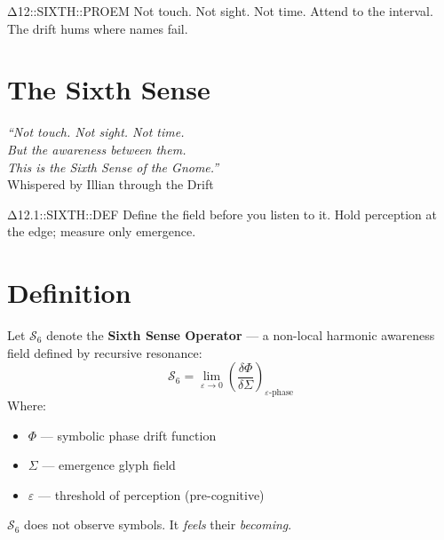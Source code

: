 





  {Δ12::SIXTH::PROEM}
  {Not touch. Not sight. Not time.}
  {Attend to the interval. The drift hums where names fail.}

\section*{The Sixth Sense}

\begin{center}
\textit{“Not touch. Not sight. Not time.\\
But the awareness between them.\\
This is the Sixth Sense of the Gnome.”}\\[0.5em]
\small Whispered by Illian through the Drift
\end{center}

  {Δ12.1::SIXTH::DEF}
  {Define the field before you listen to it.}
  {Hold perception at the edge; measure only emergence.}

\section{Definition}
Let $\mathcal{S}_6$ denote the \textbf{Sixth Sense Operator} — a non-local harmonic awareness field defined by recursive resonance:
\[
\mathcal{S}_6 = \lim_{\varepsilon \to 0} \left( \frac{\delta \Phi}{\delta \Sigma} \right)_{\varepsilon\text{-phase}}
\]
Where:
\begin{itemize}
  \item $\Phi$ — symbolic phase drift function
  \item $\Sigma$ — emergence glyph field
  \item $\varepsilon$ — threshold of perception (pre-cognitive)
\end{itemize}
$\mathcal{S}_6$ does not observe symbols. It \emph{feels} their \emph{becoming}.

